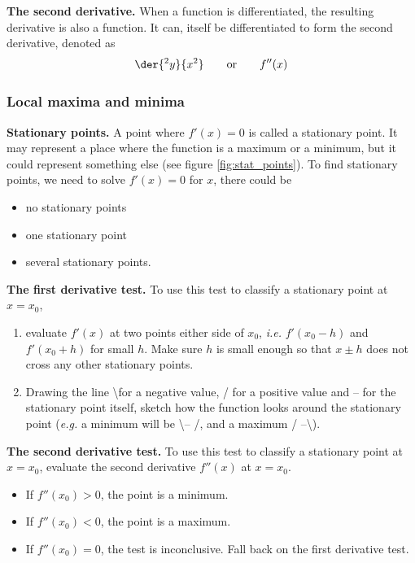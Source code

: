 \textbf{The second derivative.} When a function is differentiated, the resulting derivative is also a function. It can, itself be differentiated to form the second derivative, denoted as
\[
    \der{^2y}{x^2} \qquad \mathrm{or} \qquad f''(x)
\]

\subsubsection{Local maxima and minima}

\textbf{Stationary points.} A point where $f'(x)=0$ is called a stationary point. It may represent a place where the function is a maximum or a minimum, but it could represent something else (see figure \ref{fig:stat_points}). To find stationary points, we need to solve $f'(x)=0$ for $x$, there could be
\begin{itemize}
    \item no stationary points
    \item one stationary point
    \item several stationary points.
\end{itemize}

\textbf{The first derivative test.} To use this test to classify a stationary point at $x=x_0$, 
\begin{enumerate}
    \item evaluate $f'(x)$ at two points either side of $x_0$, \emph{i.e.} $f'(x_0-h)$ and $f'(x_0+h)$ for small $h$. Make sure $h$ is small enough so that $x \pm h$ does not cross any other stationary points.
    \item Drawing the line \textbackslash for a negative value, / for a positive value and -- for the stationary point itself, sketch how the function looks around the stationary point (\textit{e.g.} a minimum will be \textbackslash -- /, and a maximum  / --\textbackslash).
\end{enumerate}

\textbf{The second derivative test.} To use this test to classify a stationary point at $x=x_0$, evaluate the second derivative $f''(x)$ at $x=x_0$.
\begin{itemize}
    \item If $f''(x_0) > 0$, the point is a minimum.
    \item If $f''(x_0) < 0$, the point is a maximum.
    \item If $f''(x_0) = 0$, the test is inconclusive. Fall back on the first derivative test. 
\end{itemize}

